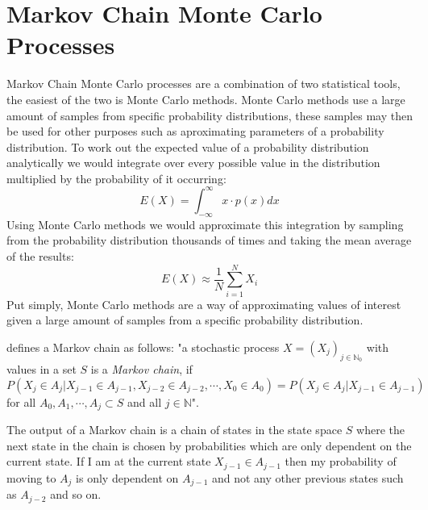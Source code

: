 \documentclass[11pt,a4paper]{report}
\begin{document}
\section{Markov Chain Monte Carlo Processes}
Markov Chain Monte Carlo processes are a combination of two statistical tools, the easiest of the two is Monte Carlo methods. Monte Carlo methods use a large amount of samples from specific probability distributions, these samples may then be used for other purposes such as aproximating parameters of a probability distribution. To work out the expected value of a probability distribution analytically we would integrate over every possible value in the distribution multiplied by the probability of it occurring:
\begin{equation}
E(X) = \int_{-\infty}^{\infty} x \cdot p(x) dx
\end{equation}
Using Monte Carlo methods we would approximate this integration by sampling from the probability distribution thousands of times and taking the mean average of the results:
\begin{equation}
E(X) \approx \frac{1}{N}\sum_{i=1}^{N} X_i 
\end{equation}
Put simply, Monte Carlo methods are a way of approximating values of interest given a large amount of samples from a specific probability distribution.

\citet{Voss14} defines a Markov chain as follows:  
"a stochastic process $X=(X_j)_{j\in \mathbb{N}_0}$ with values in a set $S$ is a \emph{Markov chain}, if
\begin{equation}
P(X_j \in A_j | X_{j-1} \in A_{j-1}, X_{j-2} \in A_{j-2}, \cdots, X_0 \in A_0) = P(X_j \in A_j | X_{j-1} \in A_{j-1})
\end{equation}
for all $A_0, A_1, \cdots,A_j \subset S$ and all $j \in \mathbb{N}$".

The output of a Markov chain is a chain of states in the state space $S$ where the next state in the chain is chosen by probabilities which are only dependent on the current state. If I am at the current state $X_{j-1} \in A_{j-1}$ then my probability of moving to $A_j$ is only dependent on $A_{j-1}$ and not any other previous states such as $A_{j-2}$ and so on. 
\end{document}
